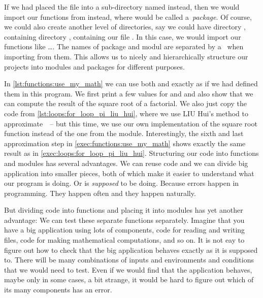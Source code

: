 If we had placed the  file into a sub-directory named  instead, then we would import our functions from  instead, where  would be called a~\emph{package}.
Of course, we could also create another level of directories, say we could have directory , containing directory , containing our file .
In this case, we would import our functions like \dots.
The names of package and modul are separated by a~ when importing from them.
This allows us to nicely and hierarchically structure our projects into modules and packages for different purposes.

In \cref{lst:functions:use_my_math} we can use both  and  exactly as if we had defined them in this program.
We first print a few values for  and  and also show that we can compute the result of the square root of a factorial.
We also just copy the code from \cref{lst:loops:for_loop_pi_liu_hui}, where we use LIU Hui's method to approximate~\numberPi\ -- but this time, we use our own implementation of the square root function instead of the one from the  module.
Interestingly, the sixth and last approximation step in \cref{exec:functions:use_my_math} shows exactly the same result as in \cref{exec:loops:for_loop_pi_liu_hui}.%
%
\FloatBarrier%
\endhsection%
%
%
\label{sec:unitTesting}%
%
%
%
Structuring our code into functions and modules has several advantages.
We can reuse code and we can divide big application into smaller pieces, both of which make it easier to understand what our program is doing.
Or is \emph{supposed} to be doing.
Because errors happen in programming.
They happen often and they happen naturally.

But dividing code into functions and placing it into modules has yet another advantage:
We can test these separate functions separately.
Imagine that you have a big application using lots of components, code for reading and writing files, code for making mathematical computations, and so on.
It is not eay to figure out how to check that the big application behaves exactly as it is supposed to.
There will be many combinations of inputs and environments and conditions that we would need to test.
Even if we would find that the application behaves, maybe only in some cases, a bit strange, it would be hard to figure out which of its many components has an error.

